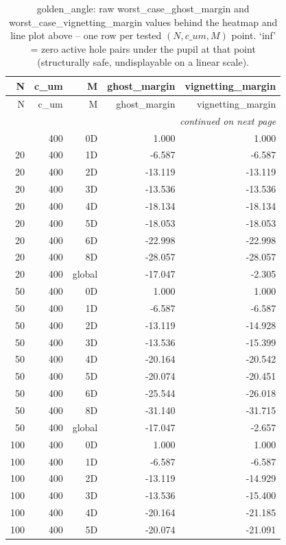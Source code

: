 \begin{longtable}{rrrrr}
\caption{golden\_angle: raw worst\_case\_ghost\_margin and worst\_case\_vignetting\_margin values behind the heatmap and line plot above -- one row per tested $(N, c\_um, M)$ point. `inf' = zero active hole pairs under the pupil at that point (structurally safe, undisplayable on a linear scale).} \\
\toprule
N & c\_um & M & ghost\_margin & vignetting\_margin \\
\midrule
\endfirsthead
\toprule
N & c\_um & M & ghost\_margin & vignetting\_margin \\
\midrule
\endhead
\midrule
\multicolumn{5}{r}{\itshape continued on next page} \\
\endfoot
\bottomrule
\endlastfoot
20 & 400 & 0D & 1.000 & 1.000 \\
20 & 400 & 1D & -6.587 & -6.587 \\
20 & 400 & 2D & -13.119 & -13.119 \\
20 & 400 & 3D & -13.536 & -13.536 \\
20 & 400 & 4D & -18.134 & -18.134 \\
20 & 400 & 5D & -18.053 & -18.053 \\
20 & 400 & 6D & -22.998 & -22.998 \\
20 & 400 & 8D & -28.057 & -28.057 \\
20 & 400 & global & -17.047 & -2.305 \\
50 & 400 & 0D & 1.000 & 1.000 \\
50 & 400 & 1D & -6.587 & -6.587 \\
50 & 400 & 2D & -13.119 & -14.928 \\
50 & 400 & 3D & -13.536 & -15.399 \\
50 & 400 & 4D & -20.164 & -20.542 \\
50 & 400 & 5D & -20.074 & -20.451 \\
50 & 400 & 6D & -25.544 & -26.018 \\
50 & 400 & 8D & -31.140 & -31.715 \\
50 & 400 & global & -17.047 & -2.657 \\
100 & 400 & 0D & 1.000 & 1.000 \\
100 & 400 & 1D & -6.587 & -6.587 \\
100 & 400 & 2D & -13.119 & -14.929 \\
100 & 400 & 3D & -13.536 & -15.400 \\
100 & 400 & 4D & -20.164 & -21.185 \\
100 & 400 & 5D & -20.074 & -21.091 \\

\end{longtable}
